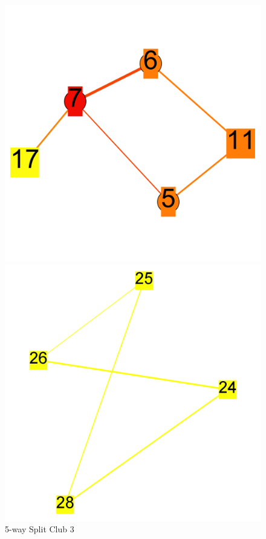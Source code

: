 \documentclass[paper=a4, fontsize=11pt]{scrartcl} %
\numberwithin{equation}{section} %
\numberwithin{figure}{section} %
\numberwithin{table}{section} %
\begin{document}
\begin{figure}[H]
\centering
\begin{minipage}{.3\textwidth}
  \centering
\includegraphics[width=1\textwidth]{5clubs/club3}
\caption{5-way Split Club 3}
\label{fig:5clubs3}
\end{minipage}%
\begin{minipage}{.4\textwidth}
  \centering
\includegraphics[width=1\textwidth]{5clubs/club4}

\end{minipage}
\end{figure}
\end{document}
